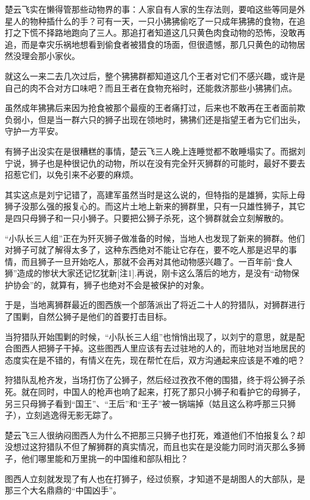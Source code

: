 楚云飞实在懒得管那些动物界的事：人家自有人家的生存法则，要咱这些等同是外星人的物种插什么的手？可有一天，一只小狒狒偷吃了一只成年狒狒的食物，在追打之下慌不择路地跑向了三人。那追打者知道这几只黄色肉食动物的恐怖，没敢再追，而是幸灾乐祸地想看到偷食者被猎食的场面，但很遗憾，那几只黄色的动物居然没理会那小家伙。

就这么一来二去几次过后，整个狒狒群都知道这几个王者对它们不感兴趣，或许是自己的肉不合对方口味吧？而且王者在食物充裕时，还能救济那些小狒狒们点。

虽然成年狒狒后来因为抢食被那个最瘦的王者痛打过，后来也不敢再在王者面前欺负弱小，但是当一群六只的狮子出现在领地时，狒狒们还是指望王者为它们出头，守护一方平安。

有狮子出没实在是很糟糕的事情，楚云飞三人晚上连睡觉都不敢睡塌实了。而据刘宁说，狮子也是种很记仇的动物，所以在没有完全歼灭狮群的可能时，最好不要去招惹它们，以免引来不必要的麻烦。

其实这点是刘宁记错了，高建军虽然当时是这么说的，但特指的是雄狮，实际上母狮子没那么强的报复心的。而这片土地上新来的狮群里，只有一只雄性狮子，其它是四只母狮子和一只小狮子。只要把公狮子杀死，这个狮群就会立刻解散的。

“小队长三人组”正在为歼灭狮子做准备的时候，当地人也发现了新来的狮群。他们对狮子可就了解得太多了，这种东西绝对不能让它存在，要不吃人那是迟早的事情，而且狮子一旦开始吃人，那就不会再对其他动物感兴趣了。一百年前“食人狮”造成的惨状大家还记忆犹新[注1].再说，刚卡这么落后的地方，是没有“动物保护协会”的，就算有，狮子也绝对不会是被保护的对象。

于是，当地离狮群最近的图西族一个部落派出了将近二十人的狩猎队，对狮群进行了围剿，自然公狮子是他们的首要打击目标。

当狩猎队开始围剿的时候，“小队长三人组”也悄悄出现了，以刘宁的意思，就是配合图西人把狮子干掉。这些图西人里应该有去过驻地的人的，而驻地对当地居民的态度实在是不错的，有情义在先，现在帮忙在后，双方沟通起来应该是不难的吧？

狩猎队乱枪齐发，当场打伤了公狮子，然后经过孜孜不倦的围猎，终于将公狮子杀死。就在同时，中国人的枪声也响了起来，打死了那只小狮子和看护它的母狮子，另三只母狮子看到“国王”、“王后”和“王子”被一锅端掉（姑且这么称呼那三只狮子），立刻逃逸得无影无踪了。

楚云飞三人很纳闷图西人为什么不把那三只狮子也打死，难道他们不怕报复么？却没想过这狩猎队不但了解狮群的真实情况，而且也实在是没能力同时消灭那么多狮子，他们哪里能和万里挑一的中国维和部队相比？

图西人立刻就发现了有人也在打狮子，经过侦察，才知道不是胡图人的大部队，是那三个大名鼎鼎的“中国凶手”。


